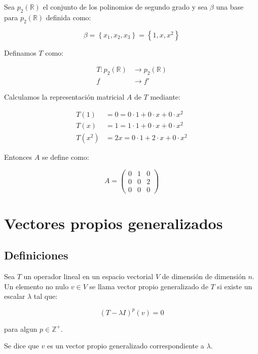 		\begin{ejemplo}
			Sea $p_2(\mathbb{R})$ el conjunto de los polinomios de segundo grado y sea $\beta$ una base para $p_2(\mathbb{R})$ definida como:

			\begin{equation*}
				\beta = \left\{ x_1, x_2, x_3 \right\} = \left\{ 1, x, x^2 \right\}
			\end{equation*}

			Definamos $T$ como:

			\begin{align*}
				T \colon p_2(\mathbb{R}) &\to p_2(\mathbb{R}) \\
				f &\to f'
			\end{align*}

			Calculamos la representación matricial $A$ de $T$ mediante:

			\begin{align*}
				T(1) &= 0 = 0 \cdot 1 + 0 \cdot x + 0 \cdot x^2 \\
				T(x) &= 1 = 1 \cdot 1 + 0 \cdot x + 0 \cdot x^2 \\
				T(x^2) &= 2x = 0 \cdot 1 + 2 \cdot x + 0 \cdot x^2
			\end{align*}

			Entonces $A$ se define como:

			\begin{equation*}
				A =
				\begin{pmatrix}
					0 & 1 & 0 \\
					0 & 0 & 2 \\
					0 & 0 & 0
				\end{pmatrix}
			\end{equation*}
		\end{ejemplo}

\newpage
\section{Vectores propios generalizados}

	\subsection{Definiciones}

		\begin{definicion}
			Sea $T$ un operador lineal en un espacio vectorial $V$ de dimensión de dimensión $n$. Un elemento no nulo $v \in V$ se llama vector propio generalizado de $T$ si existe un escalar $\lambda$ tal que:

			\begin{equation}
				(T - \lambda I)^p(v) = 0
			\end{equation}

			para algun $p \in \mathbb{Z}^+$.

			Se dice que $v$ es un vector propio generalizado correspondiente a $\lambda$.
		\end{definicion}

